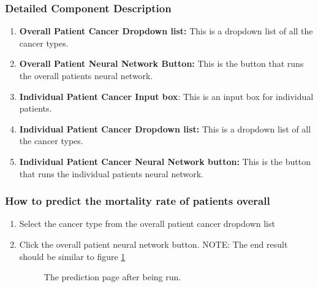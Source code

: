 \documentclass[14pt, a4paper]{article}
\begin{document}
\subsubsection{Detailed Component Description}
\begin{enumerate}
\item \textbf{Overall Patient Cancer Dropdown list:} This is a dropdown list of all the cancer types.
\item \textbf{Overall Patient Neural Network Button:} This is the button that runs the overall patients neural network.
\item \textbf{Individual Patient Cancer Input box}: This is an input box for individual patients.
\item \textbf{Individual Patient Cancer Dropdown list:} This is a dropdown list of all the cancer types.
\item \textbf{Individual Patient Cancer Neural Network button:} This is the button that runs the individual patients neural network.
\end{enumerate}
\subsubsection{How to predict the mortality rate of patients overall}
\begin{enumerate}
\item Select the cancer type from the overall patient cancer dropdown list
\item Click the overall patient neural network button. NOTE: The end result should be similar to figure \ref{fig:predict2}
\begin{figure}[H]
\centerline{}
\caption{The prediction page after being run.}
\label{fig:predict2}
\end{figure}
\end{enumerate}
\end{document}

